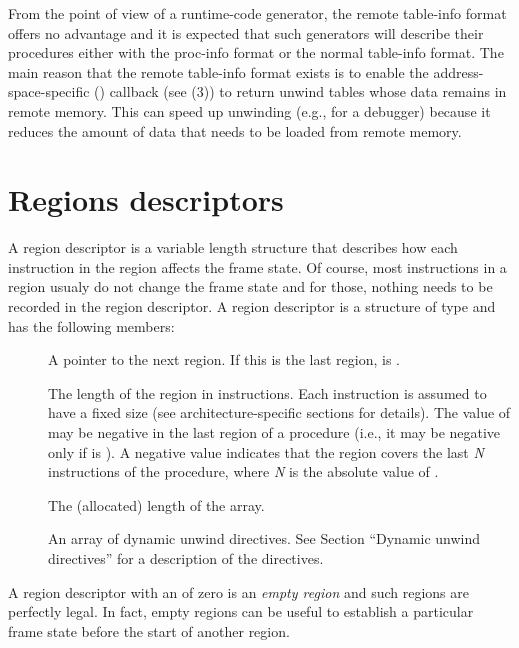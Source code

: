 \documentclass{article}
\begin{document}
From the point of view of a runtime-code generator, the remote
table-info format offers no advantage and it is expected that such
generators will describe their procedures either with the proc-info
format or the normal table-info format.  The main reason that the
remote table-info format exists is to enable the
address-space-specific () callback (see
(3)) to return unwind tables whose
data remains in remote memory.  This can speed up unwinding (e.g., for
a debugger) because it reduces the amount of data that needs to be
loaded from remote memory.

\section{Regions descriptors}

A region descriptor is a variable length structure that describes how
each instruction in the region affects the frame state.  Of course,
most instructions in a region usualy do not change the frame state and
for those, nothing needs to be recorded in the region descriptor.  A
region descriptor is a structure of type
 and has the following members:
\begin{description}
\item[] A pointer to the
  next region.  If this is the last region,  is .
\item[ ] The length of the region in
  instructions.  Each instruction is assumed to have a fixed size (see
  architecture-specific sections for details).  The value of
   may be negative in the last region of a procedure
  (i.e., it may be negative only if  is ).  A
  negative value indicates that the region covers the last \emph{N}
  instructions of the procedure, where \emph{N} is the absolute value
  of .
\item[ ] The (allocated) length of
  the  array.
\item[ ] An array of dynamic unwind
  directives.  See Section ``Dynamic unwind directives'' for a
  description of the directives.
\end{description}
A region descriptor with an  of zero is an
\emph{empty region} and such regions are perfectly legal.  In fact,
empty regions can be useful to establish a particular frame state
before the start of another region.
\end{document}

